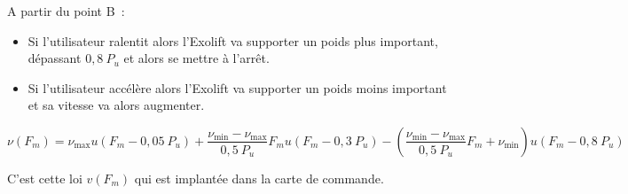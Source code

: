 \else
\fi
{}

\ifprof
\begin{texteCache}

A partir du point B~:


\begin{itemize}
\item
  Si l'utilisateur ralentit alors l'Exolift va supporter un poids plus
  important, dépassant \(0,8\ P_{u}\) et alors se mettre à l'arrêt.
\item
  Si l'utilisateur accélère alors l'Exolift va supporter un poids moins
  important et sa vitesse va alors augmenter.
\end{itemize}

\end{texteCache}

\else


\fi
{}

\ifprof
\begin{texteCache}

\[\nu\left( F_{m} \right) = \nu_{\max}u\left( F_{m} - 0,05\ P_{u} \right) + \frac{\nu_{\min} - \nu_{\max}}{0,5\ P_{u}}F_{m}u\left( F_{m} - 0,3\ P_{u} \right) - \left( \frac{\nu_{\min} - \nu_{\max}}{0,5\ P_{u}}F_{m} + \nu_{\min} \right)u\left( F_{m} - 0,8\ P_{u} \right)\]

\end{texteCache}

\else



C'est cette loi $v\left(F_{m}\right)$ qui est implantée dans la carte de commande.

